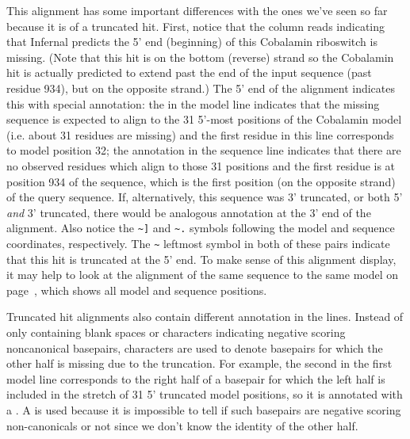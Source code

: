 This alignment has some important differences with the ones we've seen
so far because it is of a truncated hit. First, notice that the
 column reads  indicating that Infernal
predicts the 5' end (beginning) of this Cobalamin riboswitch is
missing. (Note that this hit is on the bottom (reverse) strand so the
Cobalamin hit is actually predicted to extend past the end of the
input sequence (past residue 934), but on the opposite strand.) The 5'
end of the alignment indicates this with special annotation: the
\otext{<[31]*} in the model line indicates that the missing sequence
is expected to align to the 31 5'-most positions of the Cobalamin
model (i.e. about 31 residues are missing) and the first 
residue in this line corresponds to model position 32; the
\otext{<[0]*} annotation in the sequence line indicates that there are
no observed residues which align to those 31 positions and the first
 residue is at position 934 of the sequence, which is the
first position (on the opposite strand) of the query sequence. If,
alternatively, this sequence was 3' truncated, or both 5' \emph{and}
3' truncated, there would be analogous annotation at the 3' end of the
alignment. Also notice the \verb+~]+ and \verb+~.+ symbols following
the model and sequence coordinates, respectively. The \verb+~+
leftmost symbol in both of these pairs indicate that this hit is
truncated at the 5' end. To make sense of this alignment display, it
may help to look at the  alignment of the same sequence
to the same model on page~\pageref{cmalign-cobalamin}, which shows all
model and sequence positions.

Truncated hit alignments also contain different annotation in the
 lines. Instead of only containing blank spaces or 
characters indicating negative scoring noncanonical basepairs,
 characters are used to denote basepairs for which the other
half is missing due to the truncation. For example, the second
 in the first model line corresponds to the right half of a
basepair for which the left half is included in the stretch of 31 5'
truncated model positions, so it is annotated with a .  A
 is used because it is impossible to tell if such basepairs
are negative scoring non-canonicals or not since we don't know the
identity of the other half.

